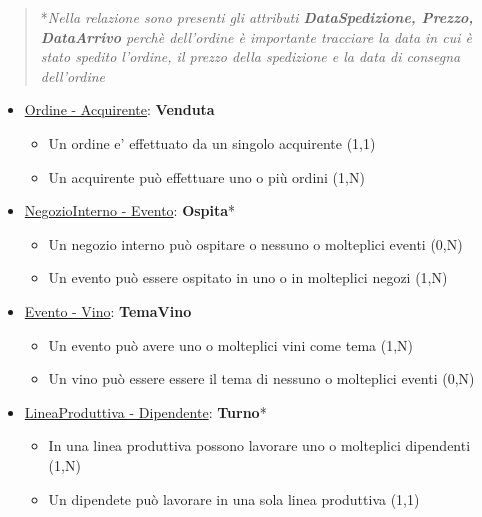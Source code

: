 \begin{verse}
	*\emph{Nella relazione sono presenti gli attributi \textbf{DataSpedizione, Prezzo, DataArrivo} perchè dell'ordine è importante tracciare la data in cui è stato spedito l'ordine, il prezzo della spedizione e la data di consegna dell'ordine}
\end{verse}

\begin{itemize}
	\item \underline{Ordine - Acquirente}: \textbf{Venduta}
	
	\begin{itemize}
		\item Un ordine e' effettuato da un singolo acquirente (1,1)
		\item Un acquirente può effettuare uno o più ordini (1,N)
	\end{itemize}
	
\end{itemize}

\begin{itemize}
	\item \underline{NegozioInterno - Evento}: \textbf{Ospita}*
	
	\begin{itemize}
		\item Un negozio interno può ospitare o nessuno o molteplici eventi (0,N)
		\item Un evento può essere ospitato in uno o in molteplici negozi (1,N)
	\end{itemize}
	
\end{itemize}

\begin{itemize}
	\item \underline{Evento - Vino}: \textbf{TemaVino}
	
	\begin{itemize}
		\item Un evento può avere uno o molteplici vini come tema (1,N)
		\item Un vino può essere essere il tema di nessuno o molteplici eventi (0,N)
	\end{itemize}
	
\end{itemize}

\begin{itemize}
	\item \underline{LineaProduttiva - Dipendente}: \textbf{Turno}*
	
	\begin{itemize}
		\item In una linea produttiva possono lavorare uno o molteplici dipendenti (1,N)
		\item Un dipendete può lavorare in una sola linea produttiva (1,1)
	\end{itemize}
	
\end{itemize}


